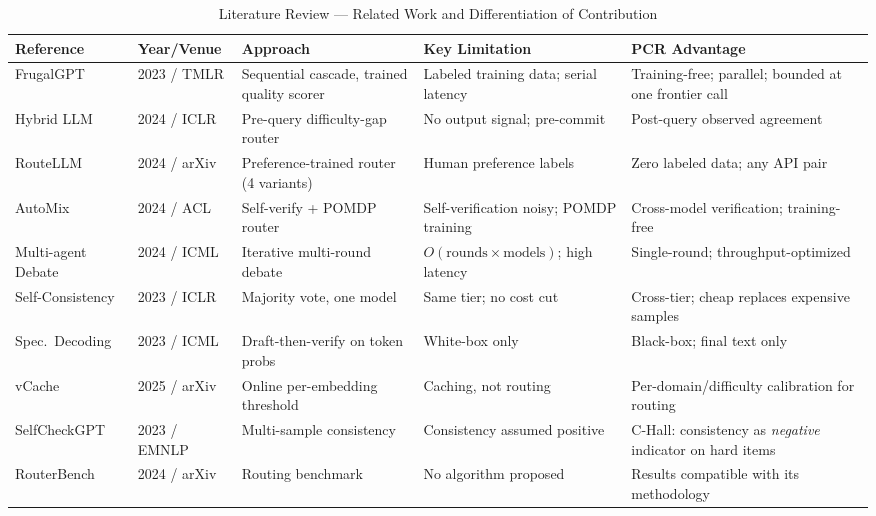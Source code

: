 \documentclass[conference]{IEEEtran}
\begin{document}
\begin{table}[!t]
\caption{Literature Review --- Related Work and Differentiation of Contribution}
\label{tab:litreview}
\renewcommand{\arraystretch}{1.2}
\begin{tabular}{p{2.6cm} p{1.9cm} p{3.2cm} p{3.4cm} p{3.6cm}}
\toprule
\textbf{Reference} & \textbf{Year/Venue} & \textbf{Approach} & \textbf{Key Limitation} & \textbf{PCR Advantage} \\
\midrule
FrugalGPT \cite{chen2023frugalgpt} & 2023 / TMLR & Sequential cascade, trained quality scorer & Labeled training data; serial latency & Training-free; parallel; bounded at one frontier call \\
Hybrid LLM \cite{ding2024hybrid} & 2024 / ICLR & Pre-query difficulty-gap router & No output signal; pre-commit & Post-query observed agreement \\
RouteLLM \cite{ong2024routellm} & 2024 / arXiv & Preference-trained router (4 variants) & Human preference labels & Zero labeled data; any API pair \\
AutoMix \cite{aggarwal2024automix} & 2024 / ACL & Self-verify + POMDP router & Self-verification noisy; POMDP training & Cross-model verification; training-free \\
Multi-agent Debate \cite{du2023multiagent} & 2024 / ICML & Iterative multi-round debate & $O(\text{rounds}\times\text{models})$; high latency & Single-round; throughput-optimized \\
Self-Consistency \cite{wang2023selfconsistency} & 2023 / ICLR & Majority vote, one model & Same tier; no cost cut & Cross-tier; cheap replaces expensive samples \\
Spec.\ Decoding \cite{leviathan2023,chen2023speculative} & 2023 / ICML & Draft-then-verify on token probs & White-box only & Black-box; final text only \\
vCache \cite{schroeder2025vcache} & 2025 / arXiv & Online per-embedding threshold & Caching, not routing & Per-domain/difficulty calibration for routing \\
SelfCheckGPT \cite{manakul2023selfcheckgpt} & 2023 / EMNLP & Multi-sample consistency & Consistency assumed positive & C-Hall: consistency as \emph{negative} indicator on hard items \\
RouterBench \cite{hu2024routerbench} & 2024 / arXiv & Routing benchmark & No algorithm proposed & Results compatible with its methodology \\
\bottomrule
\end{tabular}
\end{table}
\end{document}
